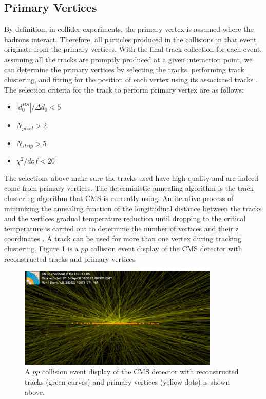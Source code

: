 \subsection{Primary Vertices}

By definition, in collider experiments, the primary vertex is assumed where the hadrons interact. Therefore, all particles produced in the collisions in that event originate from the primary vertices. With the final track collection for each event, assuming all the tracks are promptly produced at a given interaction point, we can determine the primary vertices by selecting the tracks, performing track clustering, and fitting for the position of each vertex using its associated tracks \cite{CMSTrackComp}. The selection criteria for the track to perform primary vertex are as follows:

\begin{itemize}
\item $|d_0^{BS}|/ \Delta d_0 < 5$
\item $N_{pixel} > 2$
\item $N_{strip} > 5$
\item $\chi^2/dof < 20$
\end{itemize}



The selections above make sure the tracks used have high quality and are indeed come from primary vertices. The deterministic annealing algorithm \cite{DAAlgo} is the track clustering algorithm that CMS is currently using. An iterative process of minimizing the annealing function of the longitudinal distance between the tracks and the vertices gradual temperature reduction until dropping to the critical temperature is carried out to determine the number of vertices and their z coordinates \cite{CMSTrackComp}. A track can be used for more than one vertex during tracking clustering. Figure \ref{CMSEvtDisplay} is a $pp$ collision event display of the CMS detector with reconstructed tracks and primary vertices 

\begin{figure}[hbtp]
\begin{center}
\includegraphics[width=0.85\textwidth]{Figures/Chapter4/CMSEvtDisplay.png}
\caption{A $pp$ collision event display of the CMS detector with reconstructed tracks (green curves) and primary vertices (yellow dots) is shown above.}
\label{CMSEvtDisplay}
\end{center}
\end{figure} 

